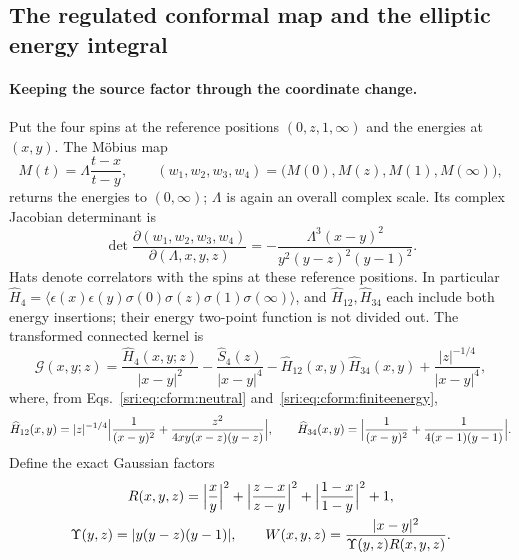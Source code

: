 \subsection{The regulated conformal map and the elliptic energy integral}\label{sri:app:cform:ellipticmap}
\paragraph{Keeping the source factor through the coordinate change.} Put the four spins at the reference positions
$(0,z,1,\infty)$ and the energies at $(x,y)$. The M\"obius map
\begin{equation}
 M(t)=\Lambda\frac{t-x}{t-y},\qquad (w_1,w_2,w_3,w_4)=\bigl(M(0),M(z),M(1),M(\infty)\bigr),
 \label{sri:eq:cform:mobius}
\end{equation}
returns the energies to $(0,\infty)$; $\Lambda$ is again an overall complex scale. Its complex Jacobian determinant is
\begin{equation}
 \det\frac{\partial(w_1,w_2,w_3,w_4)}{\partial(\Lambda,x,y,z)}=-\frac{\Lambda^3(x-y)^2}{y^2(y-z)^2(y-1)^2}.
\end{equation}
Hats denote correlators with the spins at these reference positions. In particular
$\widehat H_4=\langle\epsilon(x)\epsilon(y)\sigma(0)\sigma(z)\sigma(1)\sigma(\infty)\rangle$, and
$\widehat H_{12},\widehat H_{34}$ each include both energy insertions; their energy two-point function is not divided
out. The transformed connected kernel is
\begin{equation}
 \mathcal G(x,y;z)=\frac{\widehat H_4(x,y;z)}{|x-y|^2}-\frac{\widehat S_4(z)}{|x-y|^4}
 -\widehat H_{12}(x,y)\widehat H_{34}(x,y)+\frac{|z|^{-1/4}}{|x-y|^4},
 \label{sri:eq:cform:G}
\end{equation}
where, from Eqs.~\eqref{sri:eq:cform:neutral} and~\eqref{sri:eq:cform:finiteenergy},
\begin{equation}
 \widehat H_{12}(x,y)=|z|^{-1/4}\Bigl|\frac1{(x-y)^2}+\frac{z^2}{4xy(x-z)(y-z)}\Bigr|,\qquad
 \widehat H_{34}(x,y)=\Bigl|\frac1{(x-y)^2}+\frac1{4(x-1)(y-1)}\Bigr|.
\end{equation}
Define the exact Gaussian factors
\begin{equation}
\begin{gathered}
 R(x,y,z)=\Bigl|\frac xy\Bigr|^2+\Bigl|\frac{z-x}{z-y}\Bigr|^2+\Bigl|\frac{1-x}{1-y}\Bigr|^2+1,\\
 \Upsilon(y,z)=|y(y-z)(y-1)|,\qquad
 W(x,y,z)=\frac{|x-y|^2}{\Upsilon(y,z)R(x,y,z)}.
\end{gathered}
 \label{sri:eq:cform:W}
\end{equation}
